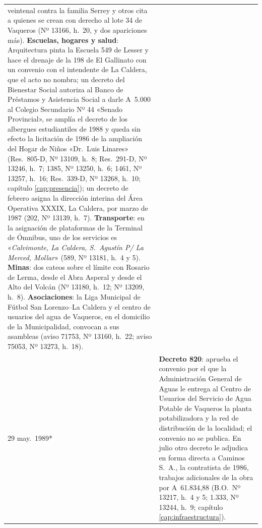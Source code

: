 \begin{longtable}{@{}p{2.7cm}p{10.3cm}@{}}
veintenal contra la familia Serrey y otros cita a quienes se crean con derecho al lote 34 de Vaqueros (Nº 13166, h.\ 20, y dos apariciones más). \textbf{Escuelas, hogares y salud}: Arquitectura pinta la Escuela 549 de Lesser y hace el drenaje de la 198 de El Gallinato con un convenio con el intendente de La Caldera, que el acto no nombra; un decreto del Bienestar Social autoriza al Banco de Préstamos y Asistencia Social a darle A~5.000 al Colegio Secundario Nº 44 «Senado Provincial», se amplía el decreto de los albergues estudiantiles de 1988 y queda sin efecto la licitación de 1986 de la ampliación del Hogar de Niños «Dr.\ Luis Linares» (Res.\ 805-D, Nº 13109, h.\ 8; Res.\ 291-D, Nº 13246, h.\ 7; 1385, Nº 13250, h.\ 6; 1461, Nº 13257, h.\ 16; Res.\ 339-D, Nº 13268, h.\ 10; capítulo \ref{cap:presencia}); un decreto de febrero asigna la dirección interina del Área Operativa XXXIX, La Caldera, por marzo de 1987 (202, Nº 13139, h.\ 7). \textbf{Transporte}: en la asignación de plataformas de la Terminal de Ómnibus, uno de los servicios es «\textit{Calvimonte, La Caldera, S.\ Agustín P/ La Merced, Mollar}» (589, Nº 13181, h.\ 4 y 5). \textbf{Minas}: dos cateos sobre el límite con Rosario de Lerma, desde el Abra Asperal y desde el Alto del Volcán (Nº 13180, h.\ 12; Nº 13209, h.\ 8). \textbf{Asociaciones}: la Liga Municipal de Fútbol San Lorenzo--La Caldera y el centro de usuarios del agua de Vaqueros, en el domicilio de la Municipalidad, convocan a sus asambleas (aviso 71753, Nº 13160, h.\ 22; aviso 75053, Nº 13273, h.\ 18). \\
29 may.\ 1989* & \textbf{Decreto 820}: aprueba el convenio por el que la Administración General de Aguas le entrega al Centro de Usuarios del Servicio de Agua Potable de Vaqueros la planta potabilizadora y la red de distribución de la localidad; el convenio no se publica. En julio otro decreto le adjudica en forma directa a Caminos S.\ A., la contratista de 1986, trabajos adicionales de la obra por A~61.834,88 (B.O.\ Nº 13217, h.\ 4 y 5; 1.333, Nº 13244, h.\ 9; capítulo \ref{cap:infraestructura}). \\

\end{longtable}

